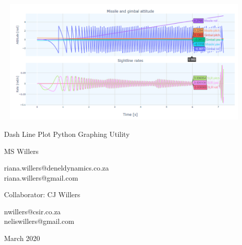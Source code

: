 \documentclass[11pt,a4paper,oldfontcommands,oneside]{memoir}
\begin{document}
%
%
\thispagestyle{empty}

{%
\sffamily
\centering
\Large

~\vspace{\fill}
\includegraphics[width=0.90\textwidth]{pic/graphs}

{\huge
Dash Line Plot Python Graphing Utility
}

\vspace{2.5cm}

{\LARGE
MS Willers
}
\vspace{0.5cm}

riana.willers@deneldynamics.co.za\\
riana.willers@gmail.com

\vspace{3.5cm}

Collaborator: CJ Willers
\vspace{0.5cm}

nwillers@csir.co.za\\
neliswillers@gmail.com

\vspace{3.5cm}

\vspace{\fill}

March 2020

}%

\clearpage

\tableofcontents*

\clearpage

\listoffigures*




\clearpage


\clearpage

\appendix

\end{document}
